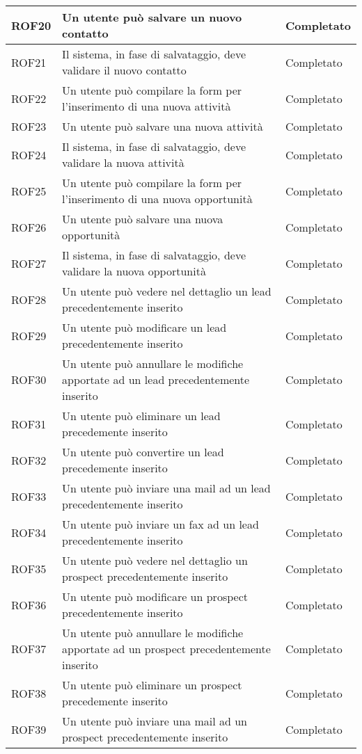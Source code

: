 \begin{longtable}[H]{|p{3cm}|p{8cm}|p{3cm}|}
	\hline
	ROF20&Un utente può salvare un nuovo contatto&Completato\\
	\hline
	ROF21&Il sistema, in fase di salvataggio, deve validare il nuovo contatto&Completato \\
	\hline
	ROF22&Un utente può compilare la form per l'inserimento di una nuova attività  &Completato\\
	\hline
	ROF23&Un utente può salvare una nuova attività&Completato\\
	\hline
	ROF24&Il sistema, in fase di salvataggio, deve validare la nuova attività&Completato \\
	\hline
	ROF25&Un utente può compilare la form per l'inserimento di una nuova opportunità  &Completato\\
	\hline
	ROF26&Un utente può salvare una nuova opportunità&Completato\\
	\hline
	ROF27&Il sistema, in fase di salvataggio, deve validare la nuova opportunità&Completato \\
	\hline
	ROF28&Un utente può vedere nel dettaglio un lead precedentemente inserito&Completato\\
	\hline
	ROF29&Un utente può modificare un lead precedentemente inserito&Completato\\
	\hline
	ROF30&Un utente può annullare le modifiche apportate ad un lead precedentemente inserito&Completato\\
	\hline
	ROF31&Un utente può eliminare un lead precedemente inserito&Completato\\
	\hline
	ROF32&Un utente può convertire un lead precedemente inserito&Completato\\
	\hline
	ROF33&Un utente può inviare una mail ad un lead precedentemente inserito&Completato \\
	\hline
	ROF34&Un utente può inviare un fax ad un lead precedentemente inserito&Completato \\
	\hline
	ROF35&Un utente può vedere nel dettaglio un prospect precedentemente inserito&Completato\\
	\hline
	ROF36&Un utente può modificare un prospect precedentemente inserito&Completato\\
	\hline
	ROF37&Un utente può annullare le modifiche apportate ad un prospect precedentemente inserito&Completato\\
	\hline
	ROF38&Un utente può eliminare un prospect precedemente inserito&Completato\\
	\hline
	ROF39&Un utente può inviare una mail ad un prospect precedentemente inserito&Completato \\

\end{longtable}
